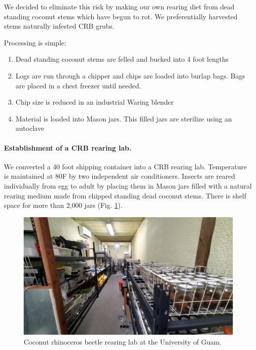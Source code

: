 \documentclass[12pt,letterpaper,english,bibliography=totocnumbered, abstract=on]{scrartcl}
\begin{document}
We decided to eliminate this risk by making our own rearing diet from dead standing coconut stems which have begun to rot. We preferentially harvested stems naturally infested CRB grubs.

Processing is simple:
\begin{enumerate}
	\item Dead standing coconut stems are felled and bucked into 4 foot lengths
	\item Logs are run through a chipper and chips are loaded into burlap bags. Bags are placed in a chest freezer until needed.
	\item Chip size is reduced in an industrial Waring blender
	\item Material is loaded into Mason jars. This filled jars are sterilize using an autoclave
\end{enumerate}

\paragraph{Establishment of a CRB rearing lab.}

We converted a 40 foot shipping container into a CRB rearing lab. Temperature is maintained at 80\degree F by two independent air conditioners. Insects are reared individually from egg to adult by placing them in Mason jars filled with a natural rearing medium made from chipped standing dead coconut stems. There is shelf space for more than 2,000 jars (Fig. \ref{fig:rearing-lab}).

\begin{figure}[h]
	\centering
	\includegraphics[width=\linewidth]{../images/rearing-lab}
	\caption{Coconut rhinoceros beetle rearing lab at the University of Guam.}
	\label{fig:rearing-lab}
\end{figure}
\end{document}
